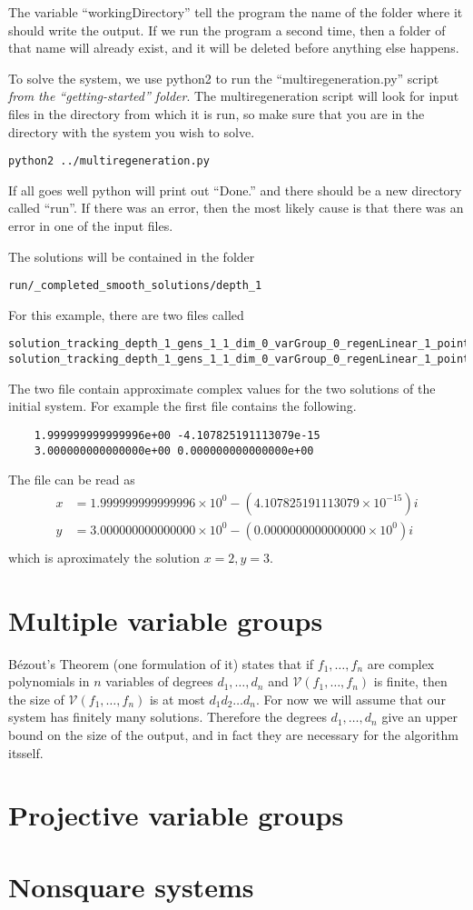 \documentclass[12pt]{article}
\begin{document}
The variable ``workingDirectory'' tell the program the name of the 
folder where it should write the output. If we run the program a second 
time, then a folder of that name will already exist, and it will be 
deleted before anything else happens.

To solve the system, we use python2 to run the ``multiregeneration.py'' 
script \emph{from the ``getting-started'' folder}. The multiregeneration 
script will look for input files in the directory from which it is run, 
so make sure that you are in the directory with the system you wish to 
solve. 

\begin{lstlisting}
python2 ../multiregeneration.py
\end{lstlisting}

If all goes well python will print out ``Done.'' and there should be 
a new directory called ``run''. If there was an error, then the most 
likely cause is that there was an error in one of the input files.

The solutions will be contained in the folder 
\begin{lstlisting}
run/_completed_smooth_solutions/depth_1
\end{lstlisting}

For this example, there are two files called 
\begin{lstlisting}
solution_tracking_depth_1_gens_1_1_dim_0_varGroup_0_regenLinear_1_pointId_326664877375_788310760051
solution_tracking_depth_1_gens_1_1_dim_0_varGroup_0_regenLinear_1_pointId_918720474422_183602510053 
\end{lstlisting}
The two file contain approximate complex values for the two solutions of 
the initial system. For example the first file contains the following.

\begin{lstlisting}
    1.999999999999996e+00 -4.107825191113079e-15
    3.000000000000000e+00 0.000000000000000e+00
\end{lstlisting}

\noindent The file can be read as
\begin{align*}
    x &= 1.999999999999996 \times 10^0 - (4.107825191113079 \times 
    10^{-15})i\\
    y &= 3.000000000000000 \times 10^0 - (0.0000000000000000 \times 
    10^{0})i\\
\end{align*}
which is aproximately the solution $x = 2, y = 3$.


\section{Multiple variable groups}
B\'{e}zout's Theorem (one formulation of it) states that if 
$f_1, \ldots, f_n$ are complex polynomials in $n$ variables of degrees 
$d_1, \ldots, d_n$ and $\mathcal{V}(f_1, \ldots, f_n)$ is finite, then 
the size of $\mathcal{V}(f_1, \ldots, f_n)$ is at most $d_1d_2 \ldots d_n$. 
For now we will assume that our system has finitely many solutions.
Therefore the degrees $d_1, \ldots, d_n$ give an upper bound on the size 
of the output, and in fact they are necessary for the algorithm itsself.
\section{Projective variable groups}
\section{Nonsquare systems}
\end{document}
